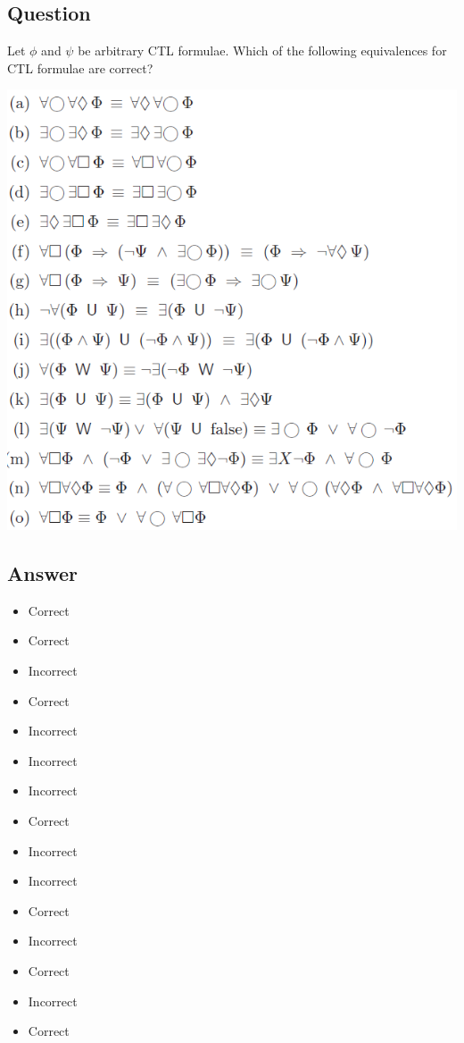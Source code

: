 \documentclass[12pt]{article}
\begin{document}
\subsection*{Question}
Let $\phi$ and $\psi$ be arbitrary CTL formulae. Which of the following equivalences for CTL formulae are correct?
\begin{center}
	\includegraphics*[scale=0.8]{ex64.png}
\end{center}
\subsection*{Answer}
\begin{itemize}
	\item Correct
	\item Correct
	\item Incorrect
	\item Correct
	\item Incorrect
	\item Incorrect
	\item Incorrect
	\item Correct
	\item Incorrect
	\item Incorrect
	\item Correct
	\item Incorrect
	\item Correct
	\item Incorrect
	\item Correct
\end{itemize}
\end{document}
